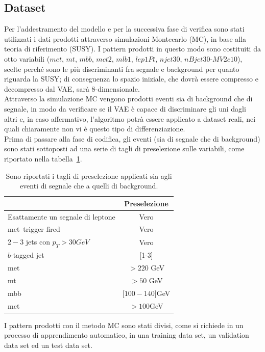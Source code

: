 \subsection{Dataset}
\label{dataset}
Per l'addestramento del modello e per la successiva fase di verifica sono stati utilizzati i dati prodotti attraverso simulazioni Montecarlo (MC), in base alla teoria di riferimento (SUSY). I pattern prodotti in questo modo sono costituiti da otto variabili ($\textit{met}$, $\textit{mt}$, $\textit{mbb}$, $\textit{mct2}$, $\textit{mlb1}$, $\textit{lep1Pt}$, $\textit{njet30}$, $\textit{nBjet30-MV2c10}$), scelte perché sono le più discriminanti fra segnale e background per quanto riguarda la SUSY; di conseguenza lo spazio iniziale, che dovrà essere compresso e decompresso dal VAE, sarà 8-dimensionale. \\
Attraverso la simulazione MC vengono prodotti eventi sia di background che di segnale, in modo da verificare se il VAE è capace di discriminare gli uni dagli altri e, in caso affermativo, l'algoritmo potrà essere applicato a dataset reali, nei quali chiaramente non vi è questo tipo di differenziazione.\\
Prima di passare alla fase di codifica, gli eventi (sia di segnale che di background) sono stati sottoposti ad una serie di tagli di preselezione sulle variabili, come riportato nella tabella~\ref{tab:tagli di preselezione}.

\begin{table}[h!]
	\centering
	\begin{tabular}{lc}
		\hline
		&Preselezione \\
		\hline
		Esattamente un segnale di leptone&Vero\\
		met\ trigger fired&Vero\\
		$2-3$ jets con $p_{T}>30 GeV$&Vero\\
		$b$-tagged jet&[1-3]\\
		met\ &$> 220$ GeV\\
		mt\ &$> 50$ GeV\\
		mbb\ &[$100-140$]GeV\\
		mct\ &$>100$GeV\\
		\hline
	\end{tabular}
	\caption{Sono riportati i tagli di preselezione applicati sia agli eventi di segnale che a quelli di background.}
	\label{tab:tagli di preselezione}
\end{table} 
I pattern prodotti con il metodo MC sono stati divisi, come si richiede in un processo di apprendimento automatico, in una training data set, un validation data set ed un test data set.
\newpage

